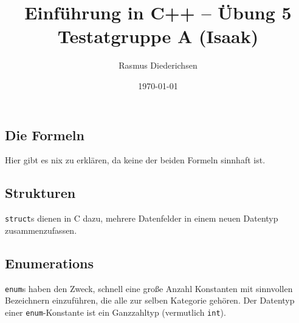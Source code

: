 \documentclass{article}
\title{Einführung in C++ -- Übung 5 \\ Testatgruppe A (Isaak)}
\author{Rasmus Diederichsen}
\date{\today}
\begin{document}
   \maketitle

   \setcounter{section}{5}

   \subsection{Die Formeln}
   
   Hier gibt es nix zu erklären, da keine der beiden Formeln sinnhaft ist. 

   \subsection{Strukturen}
   
   \texttt{struct}s dienen in C dazu, mehrere Datenfelder in einem neuen
   Datentyp zusammenzufassen. 

   \subsection{Enumerations}
   
   \texttt{enum}s haben den Zweck, schnell eine große Anzahl Konstanten mit
   sinnvollen Bezeichnern einzuführen, die alle zur selben Kategorie gehören. Der Datentyp einer
   \texttt{enum}-Konstante ist ein Ganzzahltyp (vermutlich \texttt{int}).
   
   
   
\end{document}
